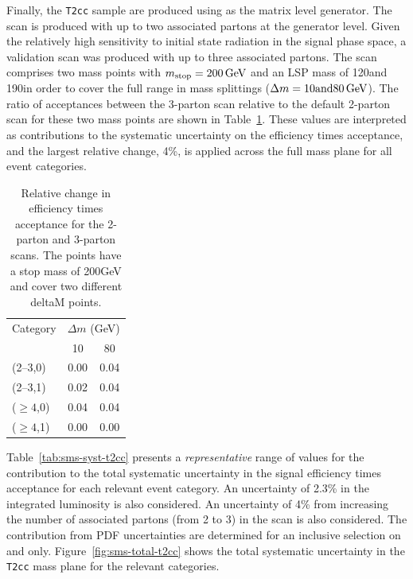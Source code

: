Finally, the \verb!T2cc! sample are produced using \MADGRAPH as the
matrix level generator. The scan is produced with up to two associated
partons at the generator level. Given the relatively high sensitivity
to initial state radiation in the signal phase space, a validation
scan was produced with up to three associated partons. The scan
comprises two mass points with $m_{\rm stop} = 200\,\text{Ge\hspace{-.08em}V}$ and an LSP
mass of 120\gev and 190\gev in order to cover the full range in mass
splittings (\ie $\Delta m = 10 {\rm and} 80\,\text{Ge\hspace{-.08em}V}$). The ratio of
acceptances between the 3-parton scan relative to the default 2-parton
scan for these two mass points are shown in
Table~\ref{tab:sms-t2cc-2v3part}. These values are interpreted as
contributions to the systematic uncertainty on the efficiency times
acceptance, and the largest relative change, 4\%, is applied across
the full mass plane for all event categories. 

\begin{table}[!h]
  \caption{Relative change in efficiency times acceptance for the
    2-parton and 3-parton scans. The points have a stop mass of
    200GeV and cover two different deltaM points.}
  \label{tab:sms-t2cc-2v3part}
  \centering
  \begin{tabular}{ lcc }
    \hline
    \hline
    Category     & \multicolumn{2}{c}{$\Delta m$ (GeV)} \\
    \cline{2-3}
                 & 10   & 80                            \\
    \hline
    (2--3,0)     & 0.00 & 0.04                          \\
    (2--3,1)     & 0.02 & 0.04                          \\
    ($\geq 4$,0) & 0.04 & 0.04                          \\
    ($\geq 4$,1) & 0.00 & 0.00                          \\
    \hline
    \hline
  \end{tabular}
\end{table}

Table~\ref{tab:sms-syst-t2cc} presents a {\it representative} range of
values for the contribution to the total systematic uncertainty in the
signal efficiency times acceptance for each relevant event
category. An uncertainty of 2.3\% in the integrated luminosity is also
considered. An uncertainty of 4\% from increasing the number of
associated partons (from 2 to 3) in the scan is also considered. The
contribution from PDF uncertainties are determined for an inclusive
selection on \njet and \nb only. Figure~\ref{fig:sms-total-t2cc} shows
the total systematic uncertainty in the \verb!T2cc! mass plane for the
relevant categories.

